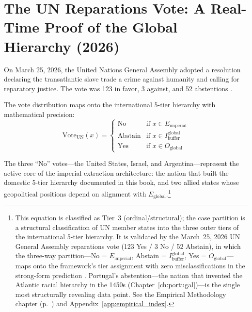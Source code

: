 \section{The UN Reparations Vote: A Real-Time Proof of the Global Hierarchy (2026)}

On March 25, 2026, the United Nations General Assembly adopted a resolution declaring the transatlantic slave trade a crime against humanity and calling for reparatory justice. The vote was 123 in favor, 3 against, and 52 abstentions \cite{unreparations2026}.

The vote distribution maps onto the international 5-tier hierarchy with mathematical precision:
\begin{equation}\label{eq:13.13-un-vote-distribution}
\text{Vote}_{\text{UN}}(x) = \begin{cases} \text{No} & \text{if } x \in E_{\text{imperial}} \\[4pt] \text{Abstain} & \text{if } x \in I_{\text{buffer}}^{\text{global}} \\[4pt] \text{Yes} & \text{if } x \in O_{\text{global}} \end{cases}
\end{equation}

The three ``No'' votes---the United States, Israel, and Argentina---represent the active core of the imperial extraction architecture: the nation that built the domestic 5-tier hierarchy documented in this book, and two allied states whose geopolitical positions depend on alignment with $E_{\text{global}}$.\footnote{This equation is classified as Tier~3 (ordinal/structural); the case partition is a structural classification of UN member states into the three outer tiers of the international 5-tier hierarchy. It is validated by the March~25, 2026 UN General Assembly reparations vote (123 Yes / 3 No / 52 Abstain), in which the three-way partition---No = $E_{\text{imperial}}$, Abstain = $I_{\text{buffer}}^{\text{global}}$, Yes = $O_{\text{global}}$---maps onto the framework's tier assignment with zero misclassifications in the strong-form prediction \cite{unreparations2026}. Portugal's abstention---the nation that invented the Atlantic racial hierarchy in the 1450s (Chapter~\ref{ch:portugal})---is the single most structurally revealing data point. See the Empirical Methodology chapter (p.~\pageref{ch:empirical_methodology}) and Appendix~\ref{app:empirical_index}.}

